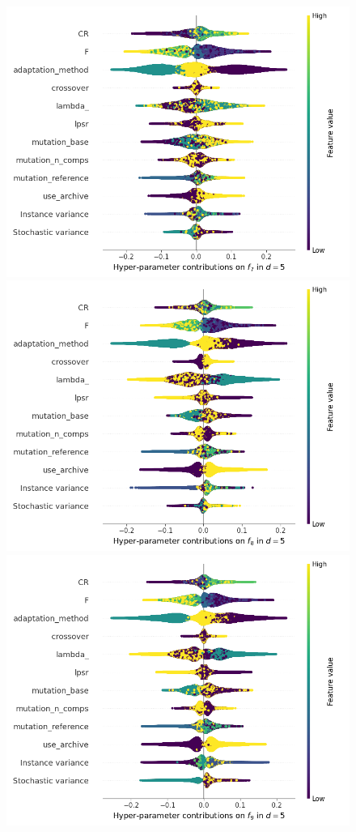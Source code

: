 \begin{figure}[t]
	\includegraphics[height=0.15\textheight,trim=60mm 0mm 30mm 0mm,clip]{de_img_new/img_summary_f7_d5.png}
	\includegraphics[height=0.15\textheight,trim=60mm 0mm 0mm 0mm,clip]{de_img_new/img_summary_f8_d5.png}
	\includegraphics[height=0.15\textheight,trim=0mm 0mm 30mm 0mm,clip]{de_img_new/img_summary_f9_d5.png}

\end{figure}
